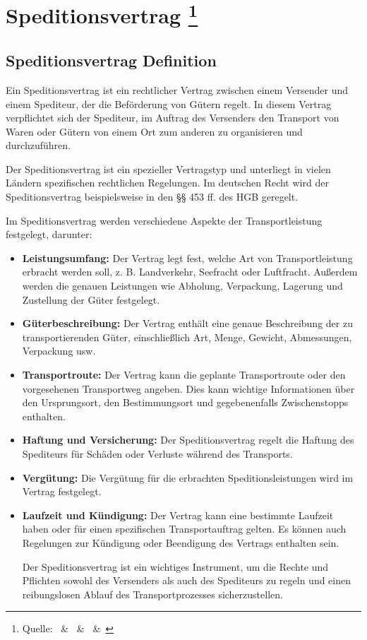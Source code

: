 
    \chapter[Speditionsvertrag]{Speditionsvertrag \footnote{Quelle:~\cite{Handelsrecht} \&~\cite{ADSp} \&~\cite{Speditionsbetriebslehre_und_Logistik} \&~\cite{Speditionsvertrag}}}

    \section{Speditionsvertrag Definition}

    Ein Speditionsvertrag ist ein rechtlicher Vertrag zwischen einem Versender  und einem Spediteur, der die Beförderung von Gütern regelt. In diesem Vertrag verpflichtet sich der Spediteur, im Auftrag des Versenders den Transport von Waren oder Gütern von einem Ort zum anderen zu organisieren und durchzuführen.

    Der Speditionsvertrag ist ein spezieller Vertragstyp und unterliegt in vielen Ländern spezifischen rechtlichen Regelungen. Im deutschen Recht wird der Speditionsvertrag beispielsweise in den §§ 453 ff. des HGB geregelt.

    Im Speditionsvertrag werden verschiedene Aspekte der Transportleistung festgelegt, darunter:
    \begin{itemize}
        \item \textbf{Leistungsumfang:} Der Vertrag legt fest, welche Art von Transportleistung erbracht werden soll, z. B. Landverkehr, Seefracht oder Luftfracht. Außerdem werden die genauen Leistungen wie Abholung, Verpackung, Lagerung und Zustellung der Güter festgelegt.
        \item \textbf{Güterbeschreibung:} Der Vertrag enthält eine genaue Beschreibung der zu transportierenden Güter, einschließlich Art, Menge, Gewicht, Abmessungen, Verpackung usw.
        \item \textbf{Transportroute:} Der Vertrag kann die geplante Transportroute oder den vorgesehenen Transportweg angeben. Dies kann wichtige Informationen über den Ursprungsort, den Bestimmungsort und gegebenenfalls Zwischenstopps enthalten.
        \item \textbf{Haftung und Versicherung:} Der Speditionsvertrag regelt die Haftung des Spediteurs für Schäden oder Verluste während des Transports.
        \item \textbf{Vergütung:} Die Vergütung für die erbrachten Speditionsleistungen wird im Vertrag festgelegt.
        \item \textbf{Laufzeit und Kündigung:} Der Vertrag kann eine bestimmte Laufzeit haben oder für einen spezifischen Transportauftrag gelten. Es können auch Regelungen zur Kündigung oder Beendigung des Vertrags enthalten sein.

    Der Speditionsvertrag ist ein wichtiges Instrument, um die Rechte und Pflichten sowohl des Versenders als auch des Spediteurs zu regeln und einen reibungslosen Ablauf des Transportprozesses sicherzustellen.
\end{itemize}
